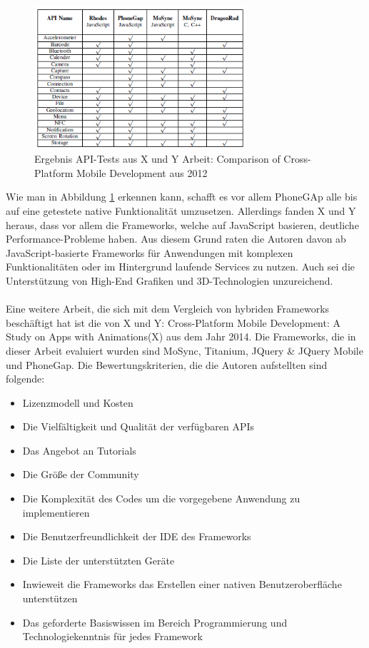\begin{figure}[h]
	\centering
	\includegraphics[width=0.7\textwidth]{Bilder/Ergebnis_Sensornutzung_Comparison_of_Cross-Platform_Mob_Dev.PNG}
	\caption{Ergebnis API-Tests aus X und Y Arbeit: Comparison of Cross-Platform Mobile Development aus 2012}
	\label{fig:Ergebnis_API_Test_Publ}
\end{figure}

Wie man in Abbildung \ref{fig:Ergebnis_API_Test_Publ} erkennen kann, schafft es vor allem PhoneGAp alle bis auf eine getestete native Funktionalität umzusetzen. Allerdings fanden X und Y heraus, dass vor allem die Frameworks, welche auf JavaScript basieren, deutliche Performance-Probleme haben. Aus diesem Grund raten die Autoren davon ab JavaScript-basierte Frameworks für Anwendungen mit komplexen Funktionalitäten oder im Hintergrund laufende Services zu nutzen. Auch sei die Unterstützung von High-End Grafiken und 3D-Technologien unzureichend. 
\\
\\
Eine weitere Arbeit, die sich mit dem Vergleich von hybriden Frameworks beschäftigt hat ist die von X und Y: Cross-Platform Mobile Development: A Study on Apps with Animations(X) aus dem Jahr 2014. Die Frameworks, die in dieser Arbeit evaluiert wurden sind MoSync, Titanium, JQuery \& JQuery Mobile und PhoneGap. Die Bewertungskriterien, die die Autoren aufstellten sind folgende:

\begin{itemize}
\item Lizenzmodell und Kosten
\item Die Vielfältigkeit und Qualität der verfügbaren APIs
\item Das Angebot an Tutorials
\item Die Größe der Community
\item Die Komplexität des Codes um die vorgegebene Anwendung zu implementieren
\item Die Benutzerfreundlichkeit der IDE des Frameworks
\item Die Liste der unterstützten Geräte
\item Inwieweit die Frameworks das Erstellen einer nativen Benutzeroberfläche unterstützen 
\item Das geforderte Basiswissen im Bereich Programmierung und Technologiekenntnis für jedes Framework
\end{itemize}

